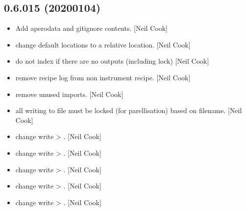 \documentclass[a4paper,10pt,english]{report}
\begin{document}
\subsection{0.6.015 (2020\sphinxhyphen{}01\sphinxhyphen{}04)}
\label{\detokenize{misc/changelog:id22}}\begin{itemize}
\item {} 
Add apero\sphinxhyphen{}data and gitignore contents. {[}Neil Cook{]}

\item {} 
 \sphinxhyphen{} change default locations
to a relative location. {[}Neil Cook{]}

\item {} 
 \sphinxhyphen{} do not index if there are no outputs
(including lock) {[}Neil Cook{]}

\item {} 
 \sphinxhyphen{} remove recipe log from non\sphinxhyphen{}
instrument recipe. {[}Neil Cook{]}

\item {} 
 \sphinxhyphen{} remove unused imports. {[}Neil Cook{]}

\item {} 
 \sphinxhyphen{} all writing to file must be locked (for
parellisation) based on filename. {[}Neil Cook{]}

\item {} 
 \sphinxhyphen{} change write \textendash{}\textgreater{} . {[}Neil Cook{]}

\item {} 
 \sphinxhyphen{} change write \textendash{}\textgreater{} . {[}Neil Cook{]}

\item {} 
 \sphinxhyphen{} change write \textendash{}\textgreater{} . {[}Neil Cook{]}

\item {} 
 \sphinxhyphen{} change write \textendash{}\textgreater{} . {[}Neil Cook{]}

\item {} 
 \sphinxhyphen{} change write \textendash{}\textgreater{} . {[}Neil Cook{]}


\end{itemize}
\end{document}
